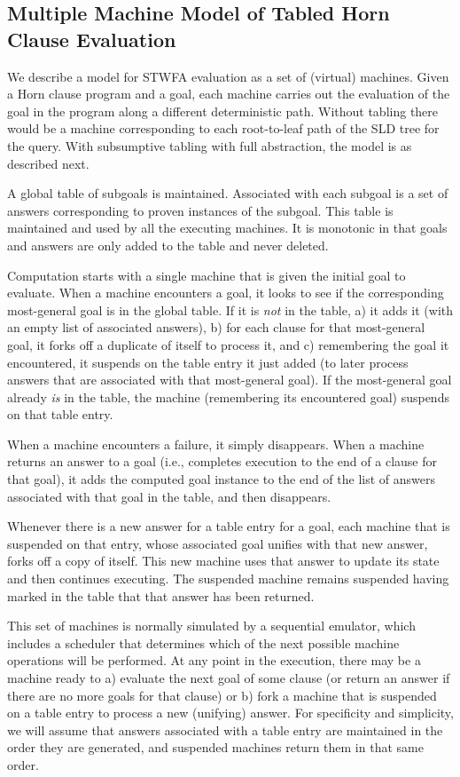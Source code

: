 \subsection{Multiple Machine Model of Tabled Horn Clause Evaluation}
We describe a model for STWFA evaluation as a set of (virtual)
machines.  Given a Horn clause program and a goal, each machine
carries out the evaluation of the goal in the program along a
different deterministic path.  Without tabling there would be a
machine corresponding to each root-to-leaf path of the SLD tree for
the query.  With subsumptive tabling with full abstraction, the model
is as described next.

A global table of subgoals is maintained.  Associated with each
subgoal is a set of answers corresponding to proven instances of the
subgoal.  This table is maintained and used by all the executing
machines.  It is monotonic in that goals and answers are only added to
the table and never deleted.

Computation starts with a single machine that is given the initial
goal to evaluate.  When a machine encounters a goal, it looks to see
if the corresponding most-general goal is in the global table.  If it
is {\em not} in the table, a) it adds it (with an empty list of
associated answers), b) for each clause for that most-general goal, it
forks off a duplicate of itself to process it, and c) remembering the
goal it encountered, it suspends on the table entry it just added (to
later process answers that are associated with that most-general
goal).  If the most-general goal already {\em is} in the table, the
machine (remembering its encountered goal) suspends on that table
entry.

When a machine encounters a failure, it simply disappears.  When a
machine returns an answer to a goal (i.e., completes execution to the
end of a clause for that goal), it adds the computed goal instance to
the end of the list of answers associated with that goal in the table,
and then disappears.

Whenever there is a new answer for a table entry for a goal, each machine
that is suspended on that entry, whose associated goal unifies with
that new answer, forks off a copy of itself.  This new machine uses
that answer to update its state and then continues executing.  The
suspended machine remains suspended having marked in the table that
that answer has been returned.

This set of machines is normally simulated by a sequential emulator,
which includes a scheduler that determines which of the next possible
machine operations will be performed.  At any point in the execution,
there may be a machine ready to a) evaluate the next goal of some
clause (or return an answer if there are no more goals for that
clause) or b) fork a machine that is suspended on a table entry to
process a new (unifying) answer.  For specificity and simplicity, we
will assume that answers associated with a table entry are maintained
in the order they are generated, and suspended machines return them in
that same order.

